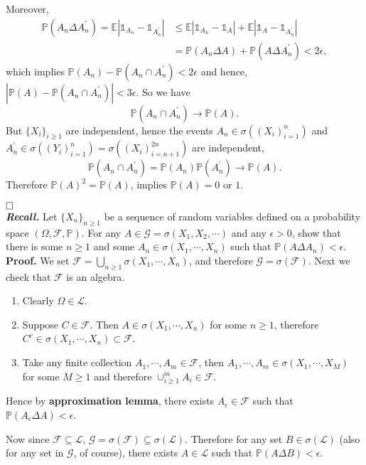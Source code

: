 \documentclass[12pt]{extarticle}
\begin{document}
Moreover,
\[
\begin{aligned}
\mathbb{P}(A_n\Delta A_n^\prime)
=
\mathbb{E}\left|\mathds{1}_{A_n}-\mathds{1}_{A_n^\prime}\right|
&\leq
\mathbb{E}\left|\mathds{1}_{A_n}-\mathds{1}_{A}\right|+\mathbb{E}\left|\mathds{1}_{A}-\mathds{1}_{A_n^\prime}\right|
\\&=
\mathbb{P}(A_n\Delta A)+\mathbb{P}(A\Delta A_n^\prime)<2\epsilon,
\end{aligned}
\]
which implies $\mathbb{P}(A_n)-\mathbb{P}(A_n\cap A_n^\prime)<2\epsilon$ and hence, $\left|\mathbb{P}(A)-\mathbb{P}(A_n\cap A_n^\prime)\right|<3\epsilon$. So we have
\[
\mathbb{P}(A_n\cap A_n^\prime)\rightarrow\mathbb{P}(A).
\]
But $\{X_i\}_{i\geq 1}$ are independent, hence the events $A_n\in\sigma\left((X_i)_{i=1}^n\right)$ and $A_n^\prime\in\sigma\left((Y_i)_{i=1}^n\right)
=\sigma\left((X_i)_{i=n+1}^{2n}\right)$ are independent,
\[
\mathbb{P}(A_n\cap A_n^\prime)=\mathbb{P}(A_n)\mathbb{P}(A_n^\prime)\rightarrow \mathbb{P}(A).
\]
Therefore $\mathbb{P}(A)^2=\mathbb{P}(A)$, implies $\mathbb{P}(A)=0\text{ or }1$.

$\hspace{\fill}\square$
\\
\textit{\textbf{Recall.}} Let $\{X_n\}_{n\geq 1}$ be a sequence of random variables defined on a probability space $(\Omega, \mathcal{F}, \mathbb{P})$. For any $A\in\mathcal{G}=\sigma(X_1, X_2,\cdots)$ and any $\epsilon > 0$, show that there is some $n\geq 1$ and some $A_n\in\sigma(X_1,\cdots,X_n)$ such that $\mathbb{P}(A\Delta A_n)<\epsilon$.\\
\textbf{Proof.} We set $\mathcal{F}=\bigcup_{n\geq 1}\sigma(X_1,\cdots,X_n)$, and therefore $\mathcal{G}=\sigma(\mathcal{F})$. Next we check that $\mathcal{F}$ is an algebra.
\begin{enumerate}
\item Clearly $\Omega\in\mathcal{L}$.
\item Suppose $C\in\mathcal{F}$. Then $A\in\sigma(X_1,\cdots,X_n)$ for some $n\geq 1$, therefore $C^c\in\sigma(X_1,\cdots,X_n)\subset\mathcal{F}$.
\item Take any finite collection $A_1,\cdots,A_m\in\mathcal{F}$, then $A_1,\cdots,A_m\in\sigma(X_1,\cdots,X_M)$ for some $M\geq 1$ and therefore $\cup_{i\geq 1}^mA_i\in\mathcal{F}$.
\end{enumerate}
Hence by \textbf{approximation lemma}, there exists $A_\epsilon\in\mathcal{F}$ such that $\mathbb{P}(A_\epsilon\Delta A)<\epsilon$.

Now since $\mathcal{F}\subseteq\mathcal{L}$, $\mathcal{G}=\sigma(\mathcal{F})\subseteq\sigma(\mathcal{L})$. Therefore for any set $B\in\sigma(\mathcal{L})$ (also for any set in $\mathcal{G}$, of course), there exists $A\in\mathcal{L}$ such that $\mathbb{P}(A\Delta B)<\epsilon$.
\end{document}
